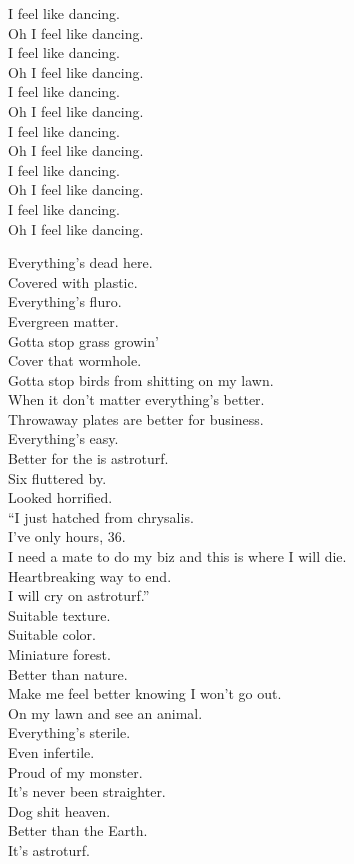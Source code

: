 I feel like dancing. \\
Oh I feel like dancing. \\
I feel like dancing. \\
Oh I feel like dancing. \\
I feel like dancing. \\
Oh I feel like dancing. \\
I feel like dancing. \\
Oh I feel like dancing. \\
I feel like dancing. \\
Oh I feel like dancing. \\
I feel like dancing. \\
Oh I feel like dancing. \\




Everything's dead here. \\
Covered with plastic. \\
Everything's fluro. \\
Evergreen matter. \\
Gotta stop grass growin' \\
Cover that wormhole. \\
Gotta stop birds from shitting on my lawn. \\
When it don't matter everything's better. \\
Throwaway plates are better for business. \\
Everything's easy. \\
Better for the  is astroturf. \\

Six  fluttered by. \\
Looked horrified. \\
``I just hatched from chrysalis. \\
I've only hours, 36. \\
I need a mate to do my biz and this is where I will die. \\
Heartbreaking way to end. \\
I will cry on astroturf.'' \\

Suitable texture. \\
Suitable color. \\
Miniature forest. \\
Better than nature. \\
Make me feel better knowing I won't go out. \\
On my lawn and see an animal. \\
Everything's sterile. \\
Even infertile. \\
Proud of my monster. \\
It's never been straighter. \\
Dog shit heaven. \\
Better than the Earth. \\
It's astroturf. \\


